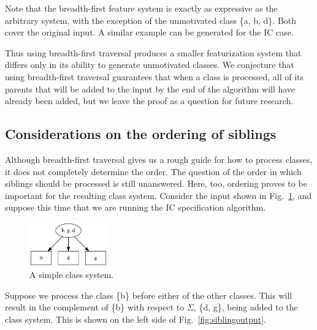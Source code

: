 \documentclass[12pt, oneside]{article}   	%
\begin{document}

Note that the breadth-first feature system is exactly as expressive as the arbitrary system, with the exception of the unmotivated class \{a, b, d\}. Both cover the original input. A similar example can be generated for the IC case.

Thus using breadth-first traversal produces a smaller featurization system that differs only in its ability to generate unmotivated classes. We conjecture that using breadth-first traversal guarantees that when a class is processed, all of its parents that will be added to the input by the end of the algorithm will have already been added, but we leave the proof as a question for future research.

\subsection{Considerations on the ordering of siblings}
\label{app:siblings}

Although breadth-first traversal gives us a rough guide for how to process classes, it does not completely determine the order. The question of the order in which siblings should be processed is still unanswered. Here, too, ordering proves to be important for the resulting class system. Consider the input shown in Fig.~\ref{fig:siblinginput}, and suppose this time that we are running the IC specification algorithm.

\begin{figure}[htb!]
	\centering
	\includegraphics[width=0.3\textwidth]{sibling_input.png}
	\caption{A simple class system.}
	\label{fig:siblinginput}
\end{figure}

Suppose we process the class \{b\} before either of the other classes. This will result in the complement of \{b\} with respect to $\Sigma$, \{d, g\}, being added to the class system. This is shown on the left side of Fig.~\ref{fig:siblingoutput}.
\end{document}

